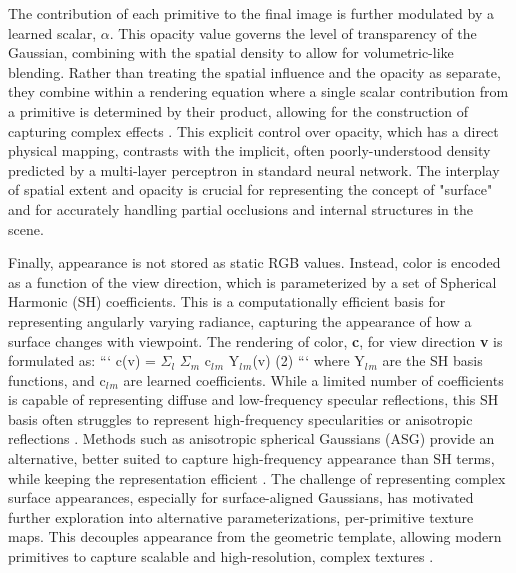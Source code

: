 \documentclass[11pt,a4paper]{article}
\begin{document}
The contribution of each primitive to the final image is further modulated by a learned scalar, \textbf{$\alpha$}. This opacity value governs the level of transparency of the Gaussian, combining with the spatial density to allow for volumetric-like blending. Rather than treating the spatial influence and the opacity as separate, they combine within a rendering equation where a single scalar contribution from a primitive is determined by their product, allowing for the construction of capturing complex effects \cite{arxiv:2103.01954v2,arxiv:2004.07484v3}. This explicit control over opacity, which has a direct physical mapping, contrasts with the implicit, often poorly-understood density predicted by a multi-layer perceptron in standard neural network. The interplay of spatial extent and opacity is crucial for representing the concept of "surface" and for accurately handling partial occlusions and internal structures in the scene.

Finally, appearance is not stored as static RGB values. Instead, color is encoded as a function of the view direction, which is parameterized by a set of Spherical Harmonic (SH) coefficients. This is a computationally efficient basis for representing angularly varying radiance, capturing the appearance of how a surface changes with viewpoint. The rendering of color, \textbf{c}, for view direction \textbf{v} is formulated as:
```
c(v) = $\Sigma$$_{l}$ $\Sigma$$_{m}$ c$_{l}$$_{m}$ Y$_{l}$$_{m}$(v)      (2)
```
where Y$_{l}$$_{m}$ are the SH basis functions, and c$_{l}$$_{m}$ are learned coefficients. While a limited number of coefficients is capable of representing diffuse and low-frequency specular reflections, this SH basis often struggles to represent high-frequency specularities or anisotropic reflections \cite{arxiv:2402.15870v1}. Methods such as anisotropic spherical Gaussians (ASG) provide an alternative, better suited to capture high-frequency appearance than SH terms, while keeping the representation efficient \cite{arxiv:2402.15870v1}. The challenge of representing complex surface appearances, especially for surface-aligned Gaussians, has motivated further exploration into alternative parameterizations, per-primitive texture maps. This decouples appearance from the geometric template, allowing modern primitives to capture scalable and high-resolution, complex textures \cite{arxiv:2403.17888v1}.
\end{document}
